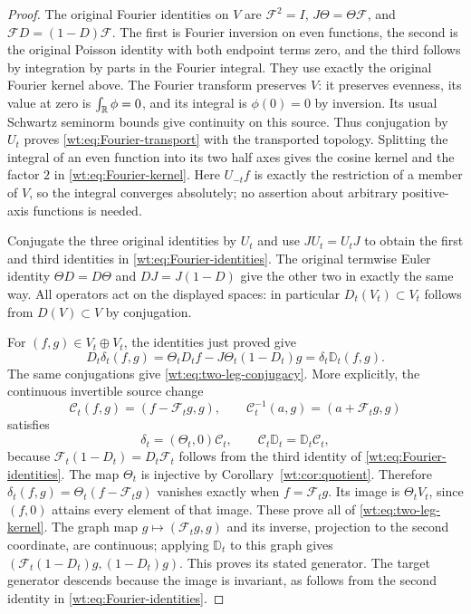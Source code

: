 \begin{proof}
The original Fourier identities on $V$ are
$\mathcal F^2=I$, $J\Theta=\Theta\mathcal F$, and
$\mathcal FD=(1-D)\mathcal F$.  The first is Fourier inversion
on even functions, the second is the original Poisson identity
with both endpoint terms zero, and the third follows by integration
by parts in the Fourier integral.  They use exactly the original
Fourier kernel above.  The Fourier transform preserves $V$:
it preserves evenness, its value at zero is $\int_\mathbb R\phi=0$,
and its integral is $\phi(0)=0$ by inversion.  Its usual Schwartz
seminorm bounds give continuity on this source.  Thus conjugation
by $U_t$ proves \eqref{wt:eq:Fourier-transport} with the
transported topology.  Splitting the integral of an even function
into its two half axes gives the cosine kernel and the factor
$2$ in \eqref{wt:eq:Fourier-kernel}.  Here $U_{-t}f$ is exactly
the restriction of a member of $V$, so the integral converges
absolutely; no assertion about arbitrary positive-axis functions
is needed.

Conjugate the three original identities by $U_t$ and use
$JU_t=U_tJ$ to obtain the first and third identities in
\eqref{wt:eq:Fourier-identities}.  The original termwise
Euler identity $\Theta D=D\Theta$ and $DJ=J(1-D)$ give the
other two in exactly the same way.  All operators act on the
displayed spaces: in particular $D_t(V_t)\subset V_t$ follows
from $D(V)\subset V$ by conjugation.

For $(f,g)\in V_t\oplus V_t$, the identities just proved give
\[
 D_t\delta_t(f,g)
 =\Theta_tD_tf-J\Theta_t(1-D_t)g
 =\delta_t\mathbb D_t(f,g).
\]
The same conjugations give \eqref{wt:eq:two-leg-conjugacy}.
More explicitly, the continuous invertible source change
\[
 \mathcal C_t(f,g)=(f-\mathcal F_tg,g),\qquad
 \mathcal C_t^{-1}(a,g)=(a+\mathcal F_tg,g)
\]
satisfies
\[
 \delta_t=(\Theta_t,0)\mathcal C_t,\qquad
 \mathcal C_t\mathbb D_t=\mathbb D_t\mathcal C_t,
\]
because $\mathcal F_t(1-D_t)=D_t\mathcal F_t$ follows from
the third identity of \eqref{wt:eq:Fourier-identities}.
The map $\Theta_t$ is injective by
Corollary~\ref{wt:cor:quotient}.  Therefore
$\delta_t(f,g)=\Theta_t(f-\mathcal F_tg)$ vanishes exactly
when $f=\mathcal F_tg$.  Its image is $\Theta_tV_t$, since
$(f,0)$ attains every element of that image.  These prove all
of \eqref{wt:eq:two-leg-kernel}.  The graph map
$g\mapsto(\mathcal F_tg,g)$ and its inverse, projection to the
second coordinate, are continuous; applying $\mathbb D_t$
to this graph gives
$(\mathcal F_t(1-D_t)g,(1-D_t)g)$.  This proves its stated
generator.  The target generator descends because the image
is invariant, as follows from the second identity in
\eqref{wt:eq:Fourier-identities}.
\end{proof}

